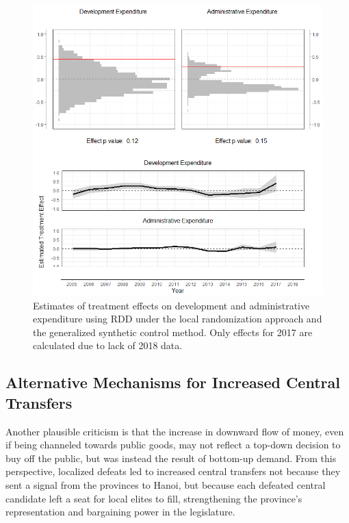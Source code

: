 \documentclass[12pt]{article}
\newcommand{\1}{\mathbbm{1}}
\begin{document}
\begin{figure}[!htbp]
	\centering
	\includegraphics[width=\textwidth]{figure/200205_mech_results.png}
	\captionsetup{singlelinecheck=off}
	\caption[Estimated RDD and synthetic control treatment effects]{Estimates of treatment effects on development and administrative expenditure using RDD under the local randomization approach and the generalized synthetic control method. Only effects for 2017 are calculated due to lack of 2018 data.}
	\label{fig:synth_rdd_mech}
\end{figure}

\subsection{Alternative Mechanisms for Increased Central Transfers}

Another plausible criticism is that the increase in downward flow of money, even if being channeled towards public goods, may not reflect a top-down decision to buy off the public, but was instead the result of bottom-up demand. From this perspective, localized defeats led to increased central transfers not because they sent a signal from the provinces to Hanoi, but because each defeated central candidate left a seat for local elites to fill, strengthening the province's representation and bargaining power in the legislature.
\end{document}
